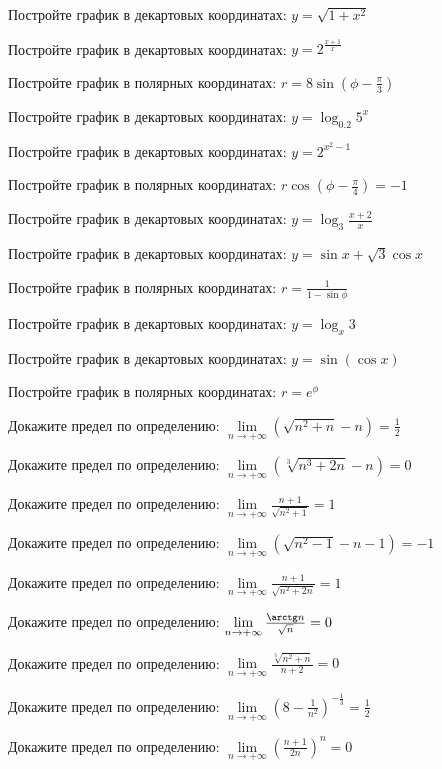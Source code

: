 \documentclass[russian]{article}
\begin{document}
Постройте график в декартовых координатах:
$y = \sqrt{1 + x^2}$

Постройте график в декартовых координатах:
$y = 2^\frac{x + 1}{x}$

Постройте график в полярных координатах:
$r = 8\sin(\phi - \frac{\pi}{3})$

Постройте график в декартовых координатах:
$y = \log_{0.2} 5^x$

Постройте график в декартовых координатах:
$y = 2^{x^2 - 1}$

Постройте график в полярных координатах:
$r\cos(\phi - \frac{\pi}{4}) = -1$

Постройте график в декартовых координатах:
$y = \log_3\frac{x + 2}{x}$

Постройте график в декартовых координатах:
$y = \sin x + \sqrt{3} \cos x$

Постройте график в полярных координатах:
$r = \frac{1}{1 - \sin\phi}$



Постройте график в декартовых координатах:
$y = \log_x 3$

Постройте график в декартовых координатах:
$y = \sin(\cos x)$

Постройте график в полярных координатах:
$r = e^\phi$




Докажите предел по определению:
$\lim\limits_{n \to +\infty} (\sqrt{n^2 + n} - n) = \frac{1}{2}$

Докажите предел по определению:
$\lim\limits_{n \to +\infty} (\sqrt[3]{n^3 + 2n} - n) = 0$

Докажите предел по определению:
$\lim\limits_{n \to +\infty} \frac{n + 1}{\sqrt{n^2 + 1}} = 1$

Докажите предел по определению:
$\lim\limits_{n \to +\infty} (\sqrt{n^2 - 1} - n - 1) = -1$

Докажите предел по определению:
$\lim\limits_{n \to +\infty} \frac{n + 1}{\sqrt{n^2 + 2n}} = 1$

Докажите предел по определению:
$\lim\limits_{n \to +\infty} \frac{\arctg n}{\sqrt{n}} = 0$

Докажите предел по определению:
$\lim\limits_{n \to +\infty} \frac{\sqrt[3]{n^2 + n}}{n + 2} = 0$

Докажите предел по определению:
$\lim\limits_{n \to +\infty} \left(8 - \frac{1}{n^2}\right)^{-\frac{1}{3}} = \frac{1}{2}$

Докажите предел по определению:
$\lim\limits_{n \to +\infty} \left(\frac{n + 1}{2n}\right)^n = 0$
\end{document}
